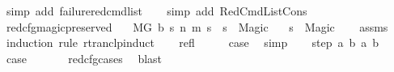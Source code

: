 \begin{isabellebody}
\ {\isacharparenleft}{\kern0pt}simp\ add{\isacharcolon}{\kern0pt}\ failure{\isacharunderscore}{\kern0pt}red{\isacharunderscore}{\kern0pt}cmd{\isacharunderscore}{\kern0pt}list{\isacharparenright}{\kern0pt}\isanewline
\ \ \isamarkupfalse%
\ {\isacharparenleft}{\kern0pt}simp\ add{\isacharcolon}{\kern0pt}\ RedCmdListCons{\isacharparenright}{\kern0pt}%
\endisatagproof
{\isafoldproof}%
%
\isadelimproof
\isanewline
%
\endisadelimproof
\isanewline
{}\isamarkupfalse%
\ red{\isacharunderscore}{\kern0pt}cfg{\isacharunderscore}{\kern0pt}magic{\isacharunderscore}{\kern0pt}preserved{\isacharcolon}{\kern0pt}\isanewline
\ \ \ {\isachardoublequoteopen}M{\isacharcomma}{\kern0pt}{\isasymLambda}{\isacharcomma}{\kern0pt}{\isasymGamma}{\isacharcomma}{\kern0pt}{\isasymOmega}{\isacharcomma}{\kern0pt}G\ {\isasymturnstile}{\isacharparenleft}{\kern0pt}b{\isacharcomma}{\kern0pt}\ s{}{\isacharparenright}{\kern0pt}\ {\isacharminus}{\kern0pt}n{\isasymrightarrow}{\isacharasterisk}{\kern0pt}\ {\isacharparenleft}{\kern0pt}m{\isacharprime}{\kern0pt}{\isacharcomma}{\kern0pt}\ s{\isacharprime}{\kern0pt}{\isacharparenright}{\kern0pt}{\isachardoublequoteclose}\ \ {\isachardoublequoteopen}s{}\ {\isacharequal}{\kern0pt}\ Magic{\isachardoublequoteclose}\isanewline
\ \ \ {\isachardoublequoteopen}s{\isacharprime}{\kern0pt}\ {\isacharequal}{\kern0pt}\ Magic{\isachardoublequoteclose}\isanewline
%
\isadelimproof
\ \ %
\endisadelimproof
%
\isatagproof
{}\isamarkupfalse%
\ assms\isanewline
{}\isamarkupfalse%
\ {\isacharparenleft}{\kern0pt}induction\ rule{\isacharcolon}{\kern0pt}\ rtranclp{\isacharunderscore}{\kern0pt}induct{}{\isacharparenright}{\kern0pt}\isanewline
\ \ \isamarkupfalse%
\ refl\isanewline
\ \ \isamarkupfalse%
\ \isamarkupfalse%
\ {\isacharquery}{\kern0pt}case\ \isamarkupfalse%
\ simp\isanewline
{}\isamarkupfalse%
\isanewline
\ \ \isamarkupfalse%
\ {\isacharparenleft}{\kern0pt}step\ a\ b\ a\ b{\isacharparenright}{\kern0pt}\isanewline
\ \ \isamarkupfalse%
\ \isamarkupfalse%
\ {\isacharquery}{\kern0pt}case\ \isanewline
\ \ \ \ \isamarkupfalse%
\ red{\isacharunderscore}{\kern0pt}cfg{\isachardot}{\kern0pt}cases\ \isamarkupfalse%
\ blast\isanewline
{}\isamarkupfalse%
%
\endisatagproof
{\isafoldproof}%
%
\isadelimproof

\end{isabellebody}
